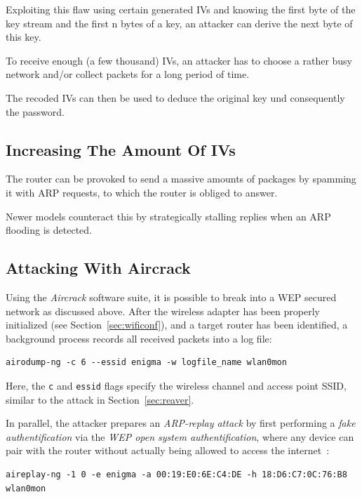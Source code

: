 Exploiting this flaw using certain generated IVs and knowing the first byte of the key stream and the first n bytes of a key, an attacker can derive the next byte of this key.

To receive enough (a few thousand) IVs, an attacker has to choose a rather busy network and/or collect packets for a long period of time.

The recoded IVs can then be used to deduce the original key und consequently the password.

\subsection{Increasing The Amount Of IVs}

The router can be provoked to send a massive amounts of packages by spamming it with ARP requests, to which the router is obliged to answer.

Newer models counteract this by strategically stalling replies when an ARP flooding is detected.

\subsection{Attacking With Aircrack}\label{sec:wepcrack}

Using the \emph{Aircrack} software suite, it is possible to break into a WEP secured network as discussed above. After the wireless adapter has been properly initialized (see Section~\ref{sec:wificonf}), and a target router has been identified, a background process records all received packets into a log file:

\begin{lstlisting}
airodump-ng -c 6 --essid enigma -w logfile_name wlan0mon
\end{lstlisting}

Here, the \lstinline{c} and \lstinline{essid} flags specify the wireless channel and access point SSID, similar to the attack in Section~\ref{sec:reaver}.

In parallel, the attacker prepares an \emph{ARP-replay attack} by first performing a \emph{fake authentification} via the \emph{WEP open system authentification}, where any device can pair with the router without actually being allowed to access the internet~\cite{WiFi16}:

\begin{lstlisting}
aireplay-ng -1 0 -e enigma -a 00:19:E0:6E:C4:DE -h 18:D6:C7:0C:76:B8 wlan0mon
\end{lstlisting}

